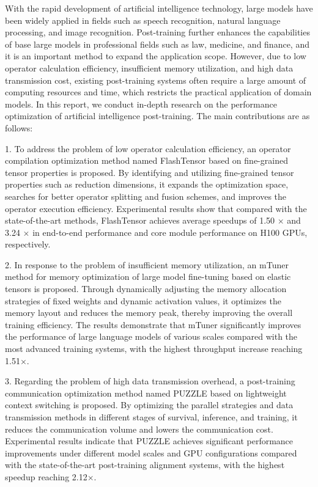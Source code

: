 \begin{abstract*}
  With the rapid development of artificial intelligence technology, large models have been widely applied in fields such as speech recognition, natural language processing, and image recognition.
  Post-training further enhances the capabilities of base large models in professional fields such as law, medicine, and finance, and it is an important method to expand the application scope.
  However, due to low operator calculation efficiency, insufficient memory utilization, and high data transmission cost, existing post-training systems often require a large amount of computing resources and time, which restricts the practical application of domain models.
  In this report, we conduct in-depth research on the performance optimization of artificial intelligence post-training. 
  The main contributions are as follows:

  1. To address the problem of low operator calculation efficiency, an operator compilation optimization method named FlashTensor based on fine-grained tensor properties is proposed. By identifying and utilizing fine-grained tensor properties such as reduction dimensions, it expands the optimization space, searches for better operator splitting and fusion schemes, and improves the operator execution efficiency.
  Experimental results show that compared with the state-of-the-art methods, FlashTensor achieves average speedups of 1.50 $\times$ and 3.24 $\times$ in end-to-end performance and core module performance on H100 GPUs, respectively. 

  2. In response to the problem of insufficient memory utilization, an mTuner method for memory optimization of large model fine-tuning based on elastic tensors is proposed. Through dynamically adjusting the memory allocation strategies of fixed weights and dynamic activation values, it optimizes the memory layout and reduces the memory peak, thereby improving the overall training efficiency.
  The results demonstrate that mTuner significantly improves the performance of large language models of various scales compared with the most advanced training systems, with the highest throughput increase reaching 1.51$\times$. 

  3. Regarding the problem of high data transmission overhead, a post-training communication optimization method named PUZZLE based on lightweight context switching is proposed. By optimizing the parallel strategies and data transmission methods in different stages of survival, inference, and training, it reduces the communication volume and lowers the communication cost.
  Experimental results indicate that PUZZLE achieves significant performance improvements under different model scales and GPU configurations compared with the state-of-the-art post-training alignment systems, with the highest speedup reaching 2.12$\times$.
  
\end{abstract*}
